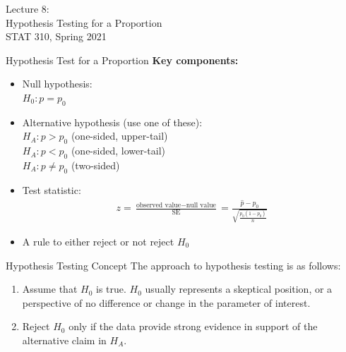 \documentclass[fleqn, 11pt]{beamer}
\begin{document}
\begin{frame}
\large
Lecture 8:\\
Hypothesis Testing for a Proportion\\
STAT 310, Spring 2021
\normalsize
\end{frame}

\begin{frame}{Hypothesis Test for a Proportion}
\textbf{Key components:}
\vspace{5pt}
\begin{itemize}
\item Null hypothesis:\\
$H_0: p = p_0$
\vspace{5pt}
\item Alternative hypothesis (use one of these):\\
$H_A: p > p_0$ (one-sided, upper-tail)\\
$H_A: p < p_0$ (one-sided, lower-tail)\\
$H_A: p \neq p_0$ (two-sided)
\vspace{5pt}
\item Test statistic:
\begin{align*}
z = \frac{\text{observed value} - \text{null value}}{\text{SE}} = 
\frac{\hat{p} - p_0}{\sqrt{\frac{p_0(1-p_0)}{n}}}
\end{align*}
\item A rule to either reject or not reject $H_0$
\end{itemize}
\end{frame}

\begin{frame}{Hypothesis Testing Concept}
The approach to hypothesis testing is as follows:
\vspace{5pt}
\begin{enumerate}
\item Assume that $H_0$ is true.  $H_0$ usually represents a skeptical position, or a perspective of no difference or change in the parameter of interest.
\vspace{5pt}
\item Reject $H_0$ only if the data provide strong evidence in support of the alternative claim in $H_A$.\\
\end{enumerate}
\end{frame}
\end{document}
